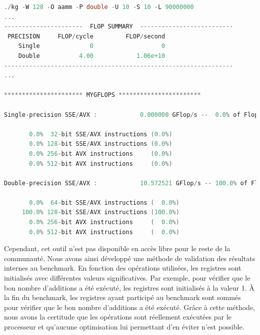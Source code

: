 \begin{lstlisting}[label=lst:basic_gflops ,language=C, caption=Validation des résultats donnés par le benchmark grâce à l'outil \textit{mygflops}.]
./kg -W 128 -O aamm -P double -U 10 -S 10 -L 90000000
...
----------------------  FLOP SUMMARY  --------------------------
 PRECISION     FLOP/cycle         FLOP/second
    Single              0                   0
    Double           4.00            1.06e+10
----------------------------------------------------------------
...

********************** MYGFLOPS ***********************
     
Single-precision SSE/AVX :            0.000000 GFlop/s --  0.0% of Flops

       0.0%  32-bit SSE/AVX instructions (0.0%)
       0.0% 128-bit SSE/AVX instructions (0.0%)
       0.0% 256-bit AVX instructions     (0.0%)
       0.0% 512-bit AVX instructions     (0.0%)
     
Double-precision SSE/AVX :            10.572521 GFlop/s -- 100.0% of Flops

       0.0%  64-bit SSE/AVX instructions (  0.0%)
     100.0% 128-bit SSE/AVX instructions (100.0%)
       0.0% 256-bit AVX instructions     (  0.0%)
       0.0% 512-bit AVX instructions     (  0.0%)

\end{lstlisting}
        
        Cependant, cet outil n'est pas disponible en accès libre pour le reste de la communauté. Nous avons ainsi développé une méthode de validation des résultats internes au benchmark. En fonction des opérations utilisées, les registres sont initialisés avec différentes valeurs significatives. Par exemple, pour vérifier que le bon nombre d'additions a été exécuté, les registres sont initialisés à la valeur 1. À la fin du benchmark, les registres ayant participé au benchmark sont sommés pour vérifier que le bon nombre d'additions a été exécuté. Grâce à cette méthode, nous avons la certitude que les opérations sont réellement exécutées par le processeur et qu'aucune optimisation lui permettant d'en éviter n'est possible. 
        

    
